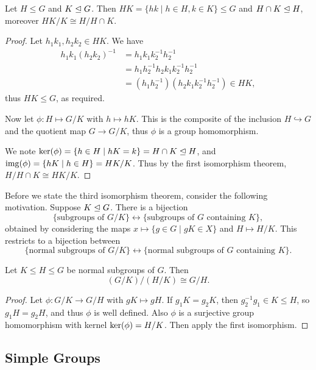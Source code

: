 \documentclass[a4paper]{scrartcl}
\begin{document}
\begin{corollary}
	Let $H \leq G$ and $K \trianglelefteq G$. Then $HK = \{hk \mid h \in H, k \in K \} \leq G$ and $H \cap K \trianglelefteq H$, moreover $HK/K \cong H/H \cap K$.
\end{corollary}
\begin{proof}
	Let $h_1 k_1, h_2 k_2 \in HK$. We have
	\begin{align*}
		h_1 k_1 (h_2 k_2)^{-1} &= h_1 k_1 k_2^{-1} h_2^{-1} \\&= h_1 h_2^{-1} h_2 k_1 k_2^{-1} h_2^{-1} \\&= (h_1 h_2^{-1}) (h_2 k_1 k_2^{-1} h_2^{-1}) \in HK,
	\end{align*}
	thus $HK \leq G$, as required.

	Now let $\phi:H \mapsto G/K$ with $h \mapsto hK$. This is the composite of the inclusion $H \hookrightarrow G$ and the quotient map $G \rightarrow G/K$, thus $\phi$ is a group homomorphism.

	We note $\operatorname{ker}(\phi) = \{h \in H \mid hK = k\} = H \cap K \trianglelefteq H$, and $\operatorname{img}(\phi) =\{hK \mid h \in H \} = HK / K$. Thus by the first isomorphism theorem,
	$
	H/H \cap K \cong HK/K.
	$
\end{proof}

Before we state the third isomorphism theorem, consider the following motivation. Suppose $K \trianglelefteq G$. There is a bijection
$$
\{\text{subgroups of } G/K \} \longleftrightarrow \{ \text{subgroups of } G \text{ containing }K \},
$$
obtained by considering the maps $x \mapsto \{g \in G \mid gK \in X \}$ and $H \mapsto H/K$. This restricts to a bijection between 
$$
\{\text{normal subgroups of }G/K \} \longleftrightarrow \{\text{normal subgroups of }G\text{ containing }K\}.
$$

\begin{corollary}
	Let $K \leq H \leq G$ be normal subgroups of $G$. Then
	$$
	(G/K) / (H/K) \cong G/H.
	$$
\end{corollary}
\begin{proof}
	Let $\phi: G/K \rightarrow G/H$ with $gK \mapsto gH$. If $g_1K = g_2 K$, then $g_2^{-1}g_1 \in K \leq H$, so $g_1 H = g_2 H$, and thus $\phi$ is well defined. Also $\phi$ is a surjective group homomorphism with kernel $\operatorname{ker}(\phi) = H/K$. Then apply the first isomorphism.
\end{proof}

\subsection{Simple Groups}
\end{document}
